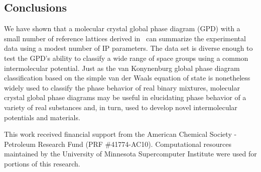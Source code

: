 \documentclass[preprint]{revtex4}
\begin{document}
\subsection{Conclusions}

We have shown that a molecular crystal global phase diagram (GPD)
with a small number of reference lattices derived
in~\cite{McClurg08} can summarize the experimental data using a
modest number of IP parameters. The data set is diverse enough to
test the GPD's ability to classify a wide range of space groups
using a common intermolecular potential. Just as the van Konynenburg
global phase diagram classification based on the simple van der
Waals equation of state is nonetheless widely used to classify the
phase behavior of real binary mixtures, molecular crystal global
phase diagrams may be useful in elucidating phase behavior of a
variety of real substances and, in turn, used to develop novel
intermolecular potentials and materials.

\begin{acknowledgments}
This work received financial support from the American Chemical
Society - Petroleum Research Fund (PRF \#41774-AC10).
%
Computational resources maintained by the University of Minnesota
Supercomputer Institute were used for portions of this research.
\end{acknowledgments}

\pagebreak


%
%


\pagebreak
\end{document}

